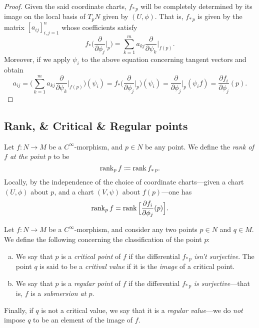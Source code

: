 \begin{proof}
Given the said coordinate charts, \(f_{*\, p}\) will be completely determined
by its image on the local basis of \(T_p N\) given by \((U, \phi)\). That is,
\(f_{*\, p}\) is given by the matrix \([a_{i j}]_{i, j=1}^n\) whose coefficients
satisfy
\[
f_{*} \Big( \frac{\partial}{\partial \phi_j}\Big|_p \Big)
= \sum_{k=1}^m a_{k j} \frac{\partial}{\partial \psi_k}\Big|_{f(p)}.
\]
Moreover, if we apply \(\psi_i\) to the above equation concerning tangent
vectors and obtain
\[
a_{ij} = \Big(
\sum_{k=1}^m a_{k j} \frac{\partial}{\partial \psi_k}\Big|_{f(p)}
\Big)(\psi_i)
= f_{*}\Big( \frac{\partial}{\partial \phi_j}\Big|_p \Big)(\psi_i)
= \frac{\partial}{\partial \phi_j}\Big|_p (\psi_i f)
= \frac{\partial f_i}{\partial \phi_j}(p).
\]
\end{proof}

\subsection{Rank, \& Critical \& Regular points}

\begin{definition}
\label{def:rank-smooth-map}
Let \(f: N \to M\) be a \(C^{\infty}\)-morphism, and \(p \in N\) be any
point. We define the \emph{rank of \(f\) at the point \(p\)} to be
\[
\operatorname{rank}_p f \coloneq \operatorname{rank} f_{*\, p}.
\]
Locally, by the independence of the choice of coordinate charts---given a chart
\((U, \phi)\) about \(p\), and a chart \((V, \psi)\) about \(f(p)\)---one has
\[
\operatorname{rank}_p f = \operatorname{rank} \Big[ \frac{\partial f_i}{\partial \phi_j}(p) \Big].
\]
\end{definition}

\begin{definition}
\label{def:critical-point-and-value}
Let \(f: N \to M\) be a \(C^{\infty}\)-morphism, and consider any two points
\(p \in N\) and \(q \in M\). We define the following concerning the
classification of the point \(p\):
\begin{enumerate}[(a)]\setlength\itemsep{0em}
\item We say that \(p\) is a \emph{critical point} of \(f\) if the differential
  \(f_{*\, p}\) \emph{isn't surjective}. The point \(q\) is said to be a
  \emph{critival value} if it is the \emph{image} of a critical point.

\item We say that \(p\) is a \emph{regular point} of \(f\) if the differential
  \(f_{*\, p}\) \emph{is surjective}---that is, \(f\) is a \emph{submersion at
    \(p\)}.
\end{enumerate}
Finally, if \(q\) is not a critical value, we say that it is a \emph{regular
  value}---we do \emph{not} impose \(q\) to be an element of the image of \(f\).
\end{definition}

